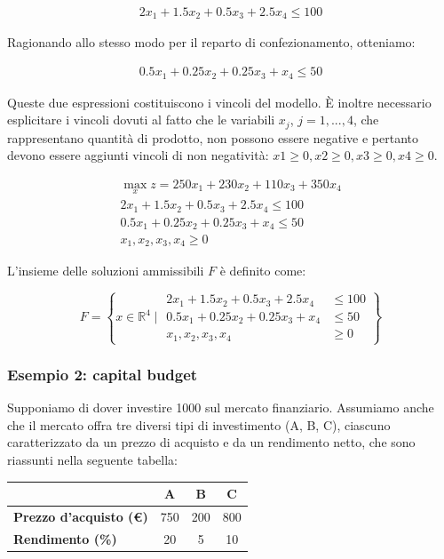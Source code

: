 \documentclass[a4paper, 11pt]{article}
\begin{document}
        \begin{align*}
            2x_1+1.5x_2+0.5x_3+2.5x_4 \le 100
        \end{align*}

        Ragionando allo stesso modo per il reparto di confezionamento, otteniamo:

        \begin{align*}
            0.5x_1+0.25x_2+0.25x_3+x_4 \le 50
        \end{align*}

        Queste due espressioni costituiscono i vincoli del modello. È inoltre necessario esplicitare i vincoli dovuti al fatto che le variabili $x_j$, $j = 1,...,4$, che rappresentano quantità di prodotto, non possono essere negative e pertanto devono essere aggiunti vincoli di non negatività: $x1 \ge 0, x2 \ge 0, x3 \ge 0, x4 \ge 0$.


        \begin{align*}
            \max_{x} z = 250x_1 + 230x_2 + 110x_3 + 350x_4 \\ 
            2x_1 + 1.5x_2 + 0.5x_3 + 2.5x_4 \leq 100 \\
            0.5x_1 + 0.25x_2 + 0.25x_3 + x_4 \leq 50 \\
            x_1, x_2, x_3, x_4 \geq 0
        \end{align*}
            
        L'insieme delle soluzioni ammissibili \( F \) è definito come:
        
        \[
        F = \left\{ x \in \mathbb{R}^4 \mid 
        \begin{aligned}
            2x_1 + 1.5x_2 + 0.5x_3 + 2.5x_4 & \leq 100 \\
            0.5x_1 + 0.25x_2 + 0.25x_3 + x_4 & \leq 50 \\
            x_1, x_2, x_3, x_4 & \geq 0
        \end{aligned}
        \right\}
        \]

        \subsubsection{Esempio 2: capital budget}
        Supponiamo di dover investire 1000 sul mercato finanziario. Assumiamo anche che il mercato offra tre diversi tipi di investimento (A, B, C), ciascuno caratterizzato da un prezzo di acquisto e da un rendimento netto, che sono riassunti nella seguente tabella:

        \begin{table}[ht]
            \centering
            \begin{tabular}{|l|c|c|c|}
            \hline
            \textbf{}              & \textbf{A} & \textbf{B} & \textbf{C} \\ \hline
            \textbf{Prezzo d'acquisto (€)} & 750         & 200         & 800         \\ 
            \textbf{Rendimento (\%)}       & 20          & 5           & 10          \\ \hline
            \end{tabular}
        \end{table}
\end{document}
